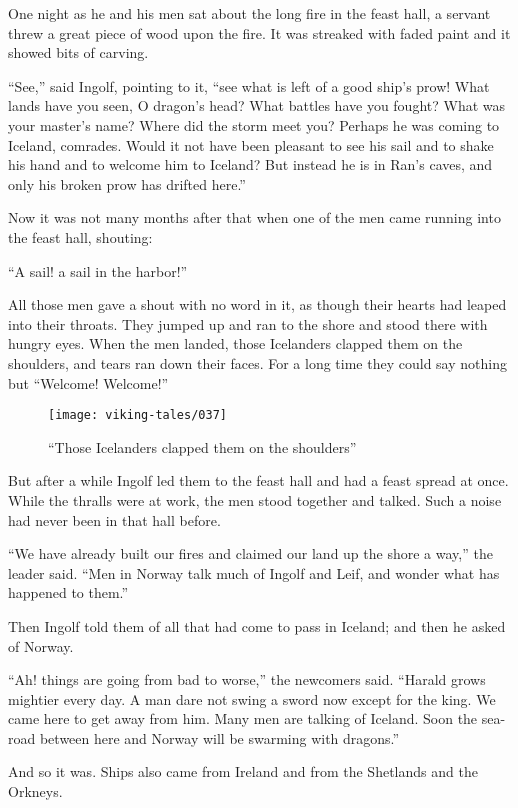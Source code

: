 One night as he and his men sat about the long fire in the feast hall, a
servant threw a great piece of wood upon the fire. It was streaked with
faded paint and it showed bits of carving.

``See,'' said Ingolf, pointing to it, ``see what is left of a good
ship's prow! What lands have you seen, O dragon's head? What battles
have you fought? What was your master's name? Where did the storm meet
you? Perhaps he was coming to Iceland, comrades. Would it not have been
pleasant to see his sail and to shake his hand and to welcome him to
Iceland? But instead he is in Ran's caves, and only his broken prow has
drifted here.''

Now it was not many months after that when one of the men came running
into the feast hall, shouting:

``A sail! a sail in the harbor!''

All those men gave a shout with no word in it, as though their hearts
had leaped into their throats. They jumped up and ran to the shore and
stood there with hungry eyes. When the men landed, those Icelanders
clapped them on the shoulders, and tears ran down their faces. For a
long time they could say nothing but ``Welcome! Welcome!''

\begin{figure}
    \centering
    \texttt{[image: viking-tales/037]}
    \caption{``Those Icelanders clapped them on the shoulders''}
\end{figure}

But after a while Ingolf led them to the feast hall and had a feast
spread at once. While the thralls were at work, the men stood together
and talked. Such a noise had never been in that hall before.

``We have already built our fires and claimed our land up the shore a
way,'' the leader said. ``Men in Norway talk much of Ingolf and Leif,
and wonder what has happened to them.''

Then Ingolf told them of all that had come to pass in Iceland; and then
he asked of Norway.

``Ah! things are going from bad to worse,'' the newcomers said. ``Harald
grows mightier every day. A man dare not swing a sword now except for
the king. We came here to get away from him. Many men are talking of
Iceland. Soon the sea-road between here and Norway will be swarming with
dragons.''

And so it was. Ships also came from Ireland and from the Shetlands and
the Orkneys.

